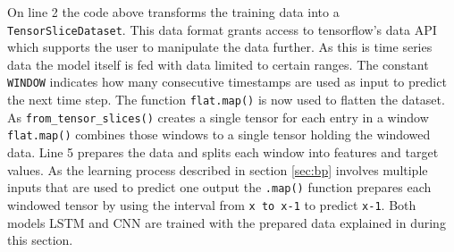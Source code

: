 On line 2 the code above transforms the training data into a \verb|TensorSliceDataset|. This data format grants access to tensorflow's data API which supports the user to manipulate the data further. As this is time series data the model itself is fed with data limited to certain ranges. The constant \verb|WINDOW| indicates how many consecutive timestamps are used as input to predict the next time step. The function \verb|flat.map()| is now used to flatten the dataset. As \verb|from_tensor_slices()| creates a single tensor for each entry in a window \verb|flat.map()| combines those windows to a single tensor holding the windowed data. Line 5 prepares the data and splits each window into features and target values. As the learning process described in section \ref{sec:bp} involves multiple inputs that are used to predict one output the \verb|.map()| function prepares each windowed tensor by using the interval from \verb|x to x-1| to predict \verb|x-1|.
Both models LSTM and CNN are trained with the prepared data explained in during this section. 

